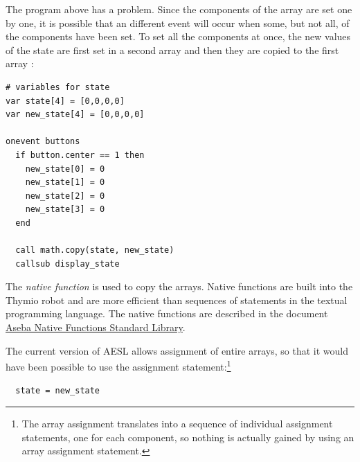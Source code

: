 \documentclass[11pt,a4paper,english]{report}
\begin{document}
The program above has a problem. Since the components of the array
 are set one by one, it is possible that an different event
will occur when some, but not all, of the components have been set. To
set all the components at once, the new values of the state are first
set in a second array  and then they are copied to the
first array :

\begin{footnotesize}
\begin{verbatim}
# variables for state
var state[4] = [0,0,0,0]
var new_state[4] = [0,0,0,0]

onevent buttons
  if button.center == 1 then
    new_state[0] = 0
    new_state[1] = 0
    new_state[2] = 0
    new_state[3] = 0
  end

  call math.copy(state, new_state)
  callsub display_state
\end{verbatim}
\end{footnotesize}

The \emph{native function}  is used to copy the arrays.
Native functions are built into the Thymio robot and are more efficient
than sequences of statements in the textual programming language. The
native functions are described in the document
\href{https://aseba.wikidot.com/en:asebastdnative}%
{Aseba Native Functions Standard Library}.

The current version of AESL allows assignment of entire arrays, so that
it would have been possible to use the assignment
statement:\footnote{The array assignment translates into a sequence of
individual assignment statements, one for each component, so nothing is
actually gained by using an array assignment statement.}

\begin{footnotesize}
\begin{verbatim}
  state = new_state
\end{verbatim}
\end{footnotesize}
\end{document}
